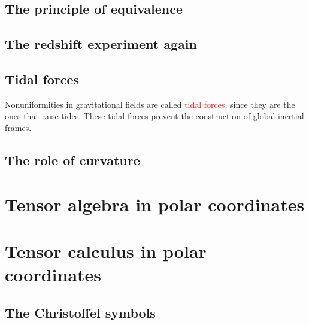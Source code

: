 \documentclass[12pt,a4paper]{article}
\begin{document}
\subsection{The principle of equivalence}
















\subsection{The redshift experiment again}













\subsection{Tidal forces}
Nonuniformities in gravitational fields are called \textcolor{red}{tidal forces}, since they are the ones that raise tides. These tidal forces prevent the construction of global inertial frames.

\subsection{The role of curvature}







\section{Tensor algebra in polar coordinates}






\section{Tensor calculus in polar coordinates}




\subsection{The Christoffel symbols}
\end{document}
